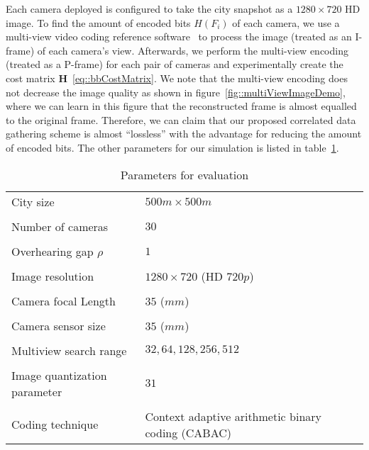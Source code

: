 Each camera deployed is configured to take the city snapshot as a $1280 \times 720$ HD image.
To find the amount of encoded bits $H(F_i)$ of each camera, we use a multi-view video coding reference software~\cite{JMVC} to process the image (treated as an I-frame) of each camera's view.
Afterwards, we perform the multi-view encoding (treated as a P-frame) for each pair of cameras and experimentally create the cost matrix $\mathbf{H}$~\eqref{eq::bbCostMatrix}.
We note that the multi-view encoding does not decrease the image quality as shown in figure~\ref{fig::multiViewImageDemo}, where we can learn in this figure that the reconstructed frame is almost equalled to the original frame.
Therefore, we can claim that our proposed correlated data gathering scheme is almost ``lossless'' with the advantage for reducing the amount of encoded bits.
The other parameters for our simulation is listed in table~\ref{tab::evaParameters}.
%
\begin{table}[htb]
\footnotesize
\centering
\begin{tabularx}{0.9\columnwidth}{X|X}
  \hline
  City size & $500m \times 500m$ \\ \\
  Number of cameras & $30$ \\ \\
  Overhearing gap $\rho$ & $1$ \\ \\
  Image resolution & $1280 \times 720$ (HD $720p$) \\ \\
  Camera focal Length & $35$ ($mm$) \\ \\
  Camera sensor size & $35$ ($mm$) \\ \\
  Multiview search range & $32,64,128,256,512$ \\ \\
  Image quantization parameter & $31$ \\ \\
  Coding technique & Context adaptive arithmetic binary coding (CABAC) \\
  \hline
\end{tabularx}
\\
\caption{\label{tab::evaParameters}Parameters for evaluation}
\end{table}
%
